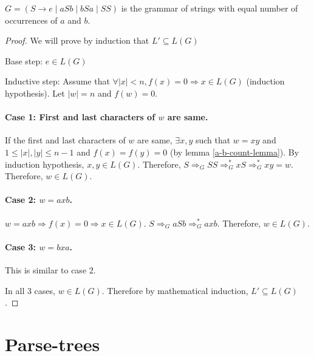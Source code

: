 \begin{theorem}
$G = (S \rightarrow e \mid aSb \mid bSa \mid SS)$ is the grammar of strings with
equal number of occurrences of $a$ and $b$.
\end{theorem}
\begin{proof}
We will prove by induction that $L' \subseteq L(G)$

Base step: $e \in L(G)$

Inductive step:
Assume that $\forall |x| < n, f(x) = 0 \Rightarrow x \in L(G)$ (induction hypothesis).
Let $|w| = n$ and $f(w) = 0$.

\paragraph{Case 1: First and last characters of $w$ are same.}
If the first and last characters of $w$ are same,
$\exists x, y$ such that $w = xy$ and $1 \le |x|, |y| \le n-1$ and $f(x) = f(y) = 0$ (by lemma \ref{a-b-count-lemma}).
By induction hypothesis, $x, y \in L(G)$.
Therefore, $S \Rightarrow_G SS \Rightarrow_G^* xS \Rightarrow_G^* xy = w$.
Therefore, $w \in L(G)$.

\paragraph{Case 2: $w = axb$.}
$w = axb \Rightarrow f(x) = 0 \Rightarrow x \in L(G)$.
$S \Rightarrow_G aSb \Rightarrow_G^* axb$.
Therefore, $w \in L(G)$.

\paragraph{Case 3: $w = bxa$.}
This is similar to case 2.

In all 3 cases, $w \in L(G)$.
Therefore by mathematical induction, $L' \subseteq L(G)$.
\end{proof}

\section{Parse-trees}

